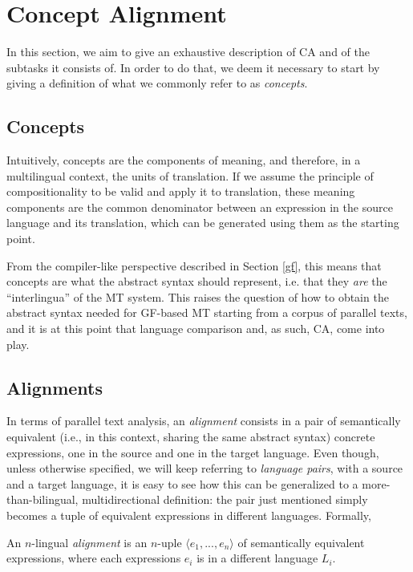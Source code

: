 \section{Concept Alignment}
In this section, we aim to give an exhaustive description of CA and of the subtasks it consists of. In order to do that, we deem it necessary to start by giving a definition of what we commonly refer to as \textit{concepts}. 

\subsection{Concepts} \label{concepts}
Intuitively, concepts are the components of meaning, and therefore, in a multilingual context, the units of translation. 
If we assume the principle of compositionality to be valid and apply it to translation, these meaning components are the common denominator between an expression in the source language and its translation, which can be generated using them as the starting point. \smallskip

From the compiler-like perspective described in Section \ref{gf}, this means that concepts are what the abstract syntax should represent, i.e. that they \textit{are} the ``interlingua'' of the MT system. 
This raises the question of how to obtain the abstract syntax needed for GF-based MT starting from a corpus of parallel texts, and it is at this point that language comparison and, as such, CA, come into play.

\subsection{Alignments} \label{aligns}
In terms of parallel text analysis, an \textit{alignment} consists in a pair of semantically equivalent (i.e., in this context, sharing the same abstract syntax) concrete expressions, one in the source and one in the target language. 
Even though, unless otherwise specified, we will keep referring to \textit{language pairs}, with a source and a target language, it is easy to see how this can be generalized to a more-than-bilingual, multidirectional definition: the pair just mentioned simply becomes a tuple of equivalent expressions in different languages. Formally, \smallskip

\begin{definition} \label{algndef}
    An $n$-lingual \textit{alignment} is an $n$-uple $\langle e_1,...,e_n \rangle$ of semantically equivalent expressions, where each expressions $e_i$ is in a different language $L_i$.
\end{definition} \smallskip

